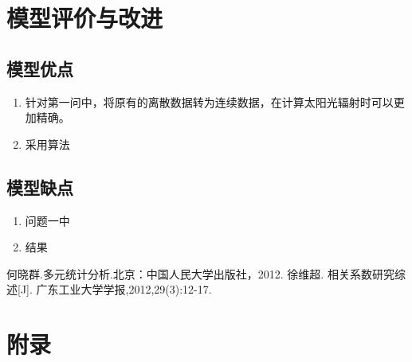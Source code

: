 \documentclass{ctexart}
\begin{document}
    \section{模型评价与改进}
    \subsection{模型优点}
    \begin{enumerate}[(1)]
        \item 针对第一问中，将原有的离散数据转为连续数据，在计算太阳光辐射时可以更加精确。
        \item 采用算法
    \end{enumerate}
    \subsection{模型缺点}
    \begin{enumerate}[(1)]
        \item 问题一中
        \item 结果
    \end{enumerate}

    \begin{thebibliography}{9} %
		何晓群.多元统计分析.北京：中国人民大学出版社，2012.
		徐维超. 相关系数研究综述[J]. 广东工业大学学报,2012,29(3):12-17.
    \end{thebibliography}
    
    \newpage
    \section{附录}
    \begin{lstlisting}
    \end{lstlisting}
\end{document}
